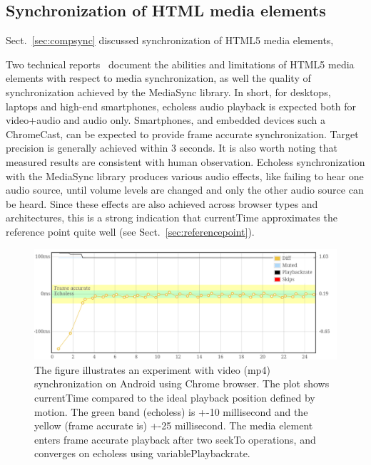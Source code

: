 \subsection {Synchronization of HTML media elements}



Sect.~\ref{sec:compsync} discussed synchronization of HTML5 media
elements, 

Two technical reports~\cite{syncreport1,syncreport2} document the abilities and
limitations of HTML5 media elements with respect to media synchronization, as
well the quality of synchronization achieved by the MediaSync library. In
short, for desktops, laptops and high-end smartphones, echoless audio playback
is expected both for video+audio and audio only. Smartphones, and embedded
devices such a ChromeCast, can be expected to provide frame accurate
synchronization. Target precision is generally achieved within 3 seconds. It
is also worth noting that measured results are consistent with human
observation. Echoless synchronization with the MediaSync library produces
various audio effects, like failing to hear one audio source, until volume
levels are changed and only the other audio source can be heard. Since these
effects are also achieved across browser types and architectures, this is a
strong indication that currentTime approximates the reference point
quite well (see Sect.~\ref{sec:referencepoint}).

\begin{figure}[h]
\centering
\includegraphics[scale=.23]{fig/android-video.png}
\caption{The figure illustrates an experiment with video (mp4) synchronization on
Android using Chrome browser. The plot shows currentTime compared to the ideal
playback position defined by motion. The green band (echoless) is +-10 millisecond and
the yellow (frame accurate is) +-25 millisecond. The media element enters frame accurate
playback after two seekTo operations, and converges on echoless using
variablePlaybackrate.}
\label{fig:videosync}
\end{figure}

